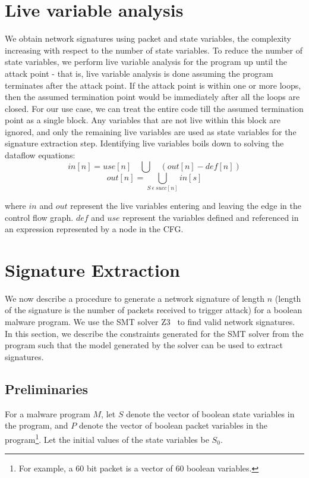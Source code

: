 \documentclass[]{article}
\begin{document}
\section{Live variable analysis} \label{sec:livevariableanalysis}
We obtain network signatures using packet and state variables, the complexity increasing with respect to the number of state variables. To reduce the number of state variables, we perform live variable analysis for the program up until the attack point - that is, live variable analysis is done assuming the program terminates after the attack point.
If the attack point is within one or more loops, then the assumed termination point would be immediately after all the loops are closed.
For our use case, we can treat the entire code till the assumed termination point as a single block. Any variables that are not live within this block are ignored, and only the remaining live variables are used as state variables for the signature extraction step.
Identifying live variables boils down to solving the dataflow equations:
$$ in[n] = use[n] \quad \bigcup  \quad (out[n] - def[n]) $$
$$ out[n] = \bigcup_{S \: \epsilon \: succ[n]}  in[s] $$

where $in$ and $out$ represent the live variables entering and leaving the edge in the control flow graph. $def$ and $use$ represent the variables defined and referenced in an expression represented by a node in the CFG.

\section{Signature Extraction} \label{sec:extraction}
We now describe a procedure to generate a network signature
of length $n$ (length of the signature is the number of packets
received to trigger attack) for a boolean malware program. 
We use the SMT solver Z3~\cite{z3}
to find valid network signatures. In this section, we describe
the constraints generated for the SMT solver from the program
such that the model generated by the solver can be used to 
extract signatures. 

\subsection{Preliminaries}
For a malware program $M$, let $S$ denote
 the vector of boolean state variables in the program,
  and $P$ denote the vector of boolean packet variables
  in the program\footnote{
  	For example, a 60 bit packet is a vector 
  	of 60 boolean variables.}. Let the
  initial values of the state variables be $S_{0}$.
\end{document}
